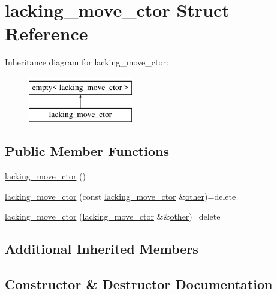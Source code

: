 \hypertarget{structlacking__move__ctor}{}\section{lacking\+\_\+move\+\_\+ctor Struct Reference}
\label{structlacking__move__ctor}
Inheritance diagram for lacking\+\_\+move\+\_\+ctor\+:\begin{figure}[H]
\begin{center}
\leavevmode
\includegraphics[height=2.000000cm]{structlacking__move__ctor}
\end{center}
\end{figure}
\subsection*{Public Member Functions}
\begin{DoxyCompactItemize}
\item 
\mbox{\hyperlink{structlacking__move__ctor_a84c6c88386d658c195ab4142bd70cee3}{lacking\+\_\+move\+\_\+ctor}} ()
\item 
\mbox{\hyperlink{structlacking__move__ctor_ab4782da2d7f5916c7c3751f15b85a3d5}{lacking\+\_\+move\+\_\+ctor}} (const \mbox{\hyperlink{structlacking__move__ctor}{lacking\+\_\+move\+\_\+ctor}} \&\mbox{\hyperlink{dictobject_8h_abd4733e17e86acb453bda62bc8b96adf}{other}})=delete
\item 
\mbox{\hyperlink{structlacking__move__ctor_aeeeb388b62f59ce44d884289008dbd27}{lacking\+\_\+move\+\_\+ctor}} (\mbox{\hyperlink{structlacking__move__ctor}{lacking\+\_\+move\+\_\+ctor}} \&\&\mbox{\hyperlink{dictobject_8h_abd4733e17e86acb453bda62bc8b96adf}{other}})=delete
\end{DoxyCompactItemize}
\subsection*{Additional Inherited Members}


\subsection{Constructor \& Destructor Documentation}
\mbox{\label{structlacking__move__ctor_a84c6c88386d658c195ab4142bd70cee3}} 
